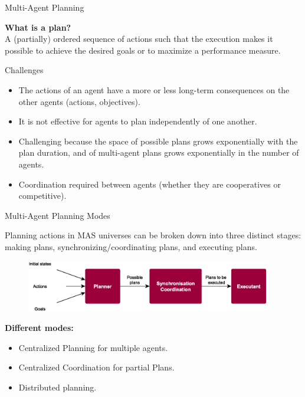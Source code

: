 \documentclass[9pt]{beamer}
\begin{document}
\begin{frame}{Multi-Agent Planning}
\begin{small}

\textbf{What is a plan?}\\
A (partially) ordered sequence of actions such that the execution makes it possible to achieve the desired goals or to maximize a performance measure.

\begin{alertblock}{Challenges}
\begin{itemize}
\item  The actions of an agent have a more or less long-term consequences on the \textcolor{CS-1light}{other} agents (actions, objectives).
\item It is not effective for agents to plan \textcolor{CS-1light}{independently} of one another.
\item Challenging because the space of possible plans grows exponentially with the plan duration, and of multi-agent plans grows exponentially in the \textcolor{CS-1light}{number of agents}.
\item \textcolor{CS-1light}{Coordination} required between agents (whether they are cooperatives or competitive).
\end{itemize}
\end{alertblock}

\end{small}
\end{frame}

\begin{frame}{Multi-Agent Planning Modes}
\begin{small}

Planning actions in MAS universes can be broken down into three distinct stages: making plans, synchronizing/coordinating plans, and executing plans. 

\begin{center}
\begin{figure}
\includegraphics[keepaspectratio, width=0.95\textwidth]{images/mas_planning.eps}
\end{figure}
\end{center}

\textbf{Different modes:}
\begin{itemize}
\item Centralized \textcolor{CS-1light}{Planning} for multiple agents.
\item Centralized \textcolor{CS-1light}{Coordination} for partial Plans.
\item \textcolor{CS-1light}{Distributed} planning.
\end{itemize}

\end{small}
\end{frame}
\end{document}
